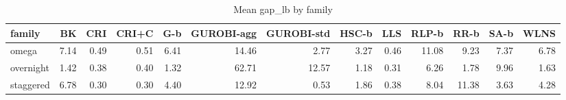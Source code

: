 \begin{table}[htbp]
\centering
\small
\caption{Mean gap\_lb by family}
\label{tab:E4a_equal_budgets_b1_by_family}
\begin{tabular}{lrrrrrrrrrrrr}
\toprule
family & BK & CRI & CRI+C & G-b & GUROBI-agg & GUROBI-std & HSC-b & LLS & RLP-b & RR-b & SA-b & WLNS \\
\midrule
omega & 7.14 & 0.49 & 0.51 & 6.41 & 14.46 & 2.77 & 3.27 & 0.46 & 11.08 & 9.23 & 7.37 & 6.78 \\
overnight & 1.42 & 0.38 & 0.40 & 1.32 & 62.71 & 12.57 & 1.18 & 0.31 & 6.26 & 1.78 & 9.96 & 1.63 \\
staggered & 6.78 & 0.30 & 0.30 & 4.40 & 12.92 & 0.53 & 1.86 & 0.38 & 8.04 & 11.38 & 3.63 & 4.28 \\
\bottomrule
\end{tabular}
\end{table}
